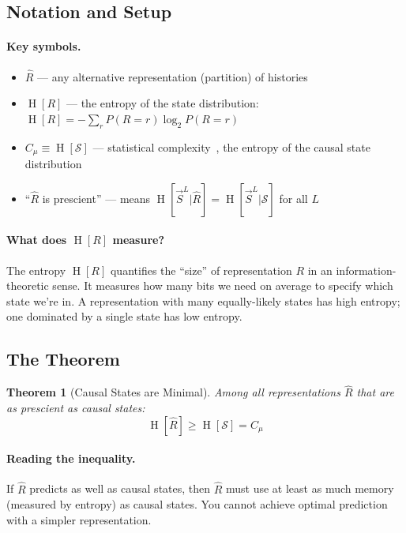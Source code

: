 \documentclass[11pt,a4paper]{article}
\theoremstyle{definition}
\theoremstyle{plain}
\newtheorem{theorem}{Theorem}[section]
\newcommand{\Cmu}{C_\mu}
\newcommand{\calS}{\mathcal{S}}
\newcommand{\Future}{\overrightarrow{S}}
\DeclareMathOperator{\Ent}{H}
\begin{document}
\subsection{Notation and Setup}

\paragraph{Key symbols.}
\begin{itemize}[nosep]
    \item $\hat{R}$ --- any alternative representation (partition) of histories
    \item $\Ent[R]$ --- the entropy of the state distribution: $\Ent[R] = -\sum_r P(R=r) \log_2 P(R=r)$
    \item $\Cmu \equiv \Ent[\calS]$ --- statistical complexity~\cite{crutchfield1989inferring}, the entropy of the causal state distribution
    \item ``$\hat{R}$ is prescient'' --- means $\Ent[\Future^L | \hat{R}] = \Ent[\Future^L | \calS]$ for all $L$
\end{itemize}

\paragraph{What does $\Ent[R]$ measure?} The entropy $\Ent[R]$ quantifies the ``size'' of representation $R$ in an information-theoretic sense. It measures how many bits we need on average to specify which state we're in. A representation with many equally-likely states has high entropy; one dominated by a single state has low entropy.

\subsection{The Theorem}

\begin{theorembox}[title=Theorem 2: Minimality~\cite{shalizi2001computational}]
\begin{theorem}[Causal States are Minimal]
\label{thm:minimality}
Among all representations $\hat{R}$ that are as prescient as causal states:
\begin{equation}
    \Ent[\hat{R}] \geq \Ent[\calS] = \Cmu
\end{equation}
\end{theorem}
\end{theorembox}

\paragraph{Reading the inequality.} If $\hat{R}$ predicts as well as causal states, then $\hat{R}$ must use at least as much memory (measured by entropy) as causal states. You cannot achieve optimal prediction with a simpler representation.
\end{document}
